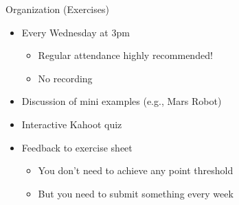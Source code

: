 \documentclass[aspectratio=169]{../latex_main/tntbeamer}  %
\begin{document}
\begin{frame}[c]{Organization (Exercises)}
	
	\begin{itemize}
		\item Every Wednesday at 3pm
		\begin{itemize}
			\item Regular attendance highly recommended!
			\item No recording
		\end{itemize}
		\pause
		\item Discussion of mini examples (e.g., Mars Robot)
		\pause
		\item Interactive Kahoot quiz
		\pause
		\item Feedback to exercise sheet
		\begin{itemize}
			\item You don't need to achieve any point threshold
			\item But you need to submit something every week
		\end{itemize}
	
	\end{itemize}
	
\end{frame}
\end{document}
